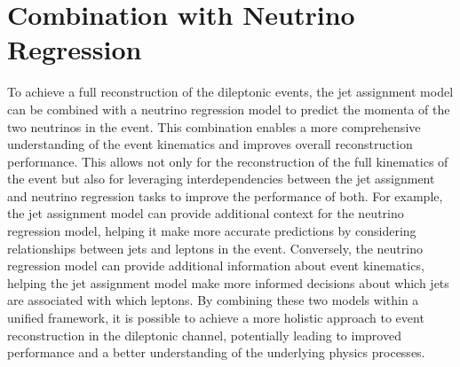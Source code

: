\section{Combination with Neutrino Regression}
\label{sec:combination-with-neutrino-regression}
To achieve a full reconstruction of the dileptonic \ttbar events, the jet assignment model can be combined with a neutrino regression model to predict the momenta of the two neutrinos in the event. This combination enables a more comprehensive understanding of the event kinematics and improves overall reconstruction performance. This allows not only for the reconstruction of the full kinematics of the event but also for leveraging interdependencies between the jet assignment and neutrino regression tasks to improve the performance of both. For example, the jet assignment model can provide additional context for the neutrino regression model, helping it make more accurate predictions by considering relationships between jets and leptons in the event. Conversely, the neutrino regression model can provide additional information about event kinematics, helping the jet assignment model make more informed decisions about which jets are associated with which leptons. By combining these two models within a unified framework, it is possible to achieve a more holistic approach to event reconstruction in the dileptonic \ttbar channel, potentially leading to improved performance and a better understanding of the underlying physics processes.

